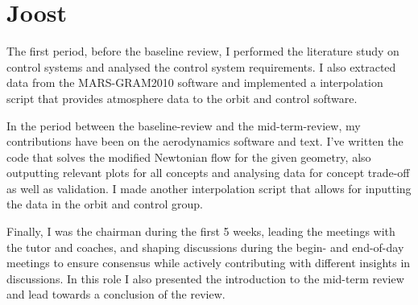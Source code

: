 \section{Joost}

The first period, before the baseline review, I performed the literature study on control systems and analysed the control system requirements. I also extracted data from the MARS-GRAM2010 software and implemented a interpolation script that provides atmosphere data to the orbit and control software.

In the period between the baseline-review and the mid-term-review, my contributions have been on the aerodynamics software and text. I've written the code that solves the modified Newtonian flow for the given geometry, also outputting relevant plots for all concepts and analysing data for concept trade-off as well as validation. I made another interpolation script that allows for inputting the data in the orbit and control group.

Finally, I was the chairman during the first 5 weeks, leading the meetings with the tutor and coaches, and shaping discussions during the begin- and end-of-day meetings to ensure consensus while actively contributing with different insights in discussions. In this role I also presented the introduction to the mid-term review and lead towards a conclusion of the review.